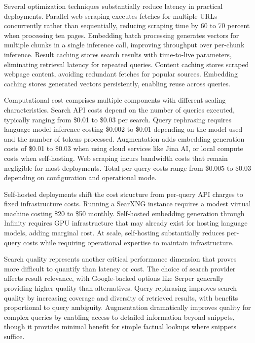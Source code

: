 Several optimization techniques substantially reduce latency in practical deployments. Parallel web scraping executes fetches for multiple URLs concurrently rather than sequentially, reducing scraping time by 60 to 70 percent when processing ten pages. Embedding batch processing generates vectors for multiple chunks in a single inference call, improving throughput over per-chunk inference. Result caching stores search results with time-to-live parameters, eliminating retrieval latency for repeated queries. Content caching stores scraped webpage content, avoiding redundant fetches for popular sources. Embedding caching stores generated vectors persistently, enabling reuse across queries.

Computational cost comprises multiple components with different scaling characteristics. 
Search API costs depend on the number of queries executed, typically ranging from 
\$0.01 to \$0.03 per search. 
Query rephrasing requires language model inference costing 
\$0.002 to \$0.01 depending on the model used and the number of tokens processed. 
Augmentation adds embedding generation costs of 
\$0.01 to \$0.03 when using cloud services like Jina AI, 
or local compute costs when self-hosting. 
Web scraping incurs bandwidth costs that remain negligible for most deployments. 
Total per-query costs range from \$0.005 to \$0.03 depending on configuration 
and operational mode.

Self-hosted deployments shift the cost structure from per-query API charges to fixed infrastructure costs. Running a SearXNG instance requires a modest virtual machine costing 
\$20 to \$50 monthly. Self-hosted embedding generation through Infinity requires GPU infrastructure that may already exist for hosting language models, adding marginal cost. At scale, self-hosting substantially reduces per-query costs while requiring operational expertise to maintain infrastructure.

Search quality represents another critical performance dimension that proves more difficult to quantify than latency or cost. The choice of search provider affects result relevance, with Google-backed options like Serper generally providing higher quality than alternatives. Query rephrasing improves search quality by increasing coverage and diversity of retrieved results, with benefits proportional to query ambiguity. Augmentation dramatically improves quality for complex queries by enabling access to detailed information beyond snippets, though it provides minimal benefit for simple factual lookups where snippets suffice.


